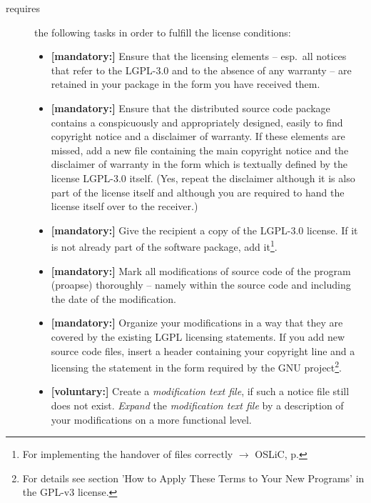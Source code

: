 \begin{description}
\item[requires] the following tasks in order to fulfill the license conditions:
\begin{itemize}
  
  \item \textbf{[mandatory:]} Ensure that the licensing elements -- esp.\ all
  notices that refer to the LGPL-3.0 and to the absence of any
  warranty -- are retained in your package in the form you have received them.

  \item \textbf{[mandatory:]} Ensure that the distributed source code package
  contains a conspicuously and appropriately designed, easily to find copyright
  notice and a disclaimer of warranty. If these elements are missed, add a new
  file containing the main copyright notice and the disclaimer of warranty in the
  form which is textually defined by the license LGPL-3.0 itself. (Yes, repeat
  the disclaimer although it is also part of the license itself and although you
  are required to hand the license itself over to the receiver.)
  
  \item \textbf{[mandatory:]} Give the recipient a copy of the LGPL-3.0 license.
  If it is not already part of the software package, add it\footnote{For
  implementing the handover of files correctly $\rightarrow$ OSLiC, p.
  \pageref{DistributingFilesHint}}.

  \item \textbf{[mandatory:]} Mark all modifications of source code of the
  program (proapse) thoroughly -- namely within the source code and including
  the date of the modification.
  
  \item \textbf{[mandatory:]} Organize your modifications in a way that they are
  covered by the existing LGPL licensing statements. If you add new source code
  files, insert a header containing your copyright line and a licensing the
  statement in the form required by the GNU project\footnote{For details see
  section 'How to Apply These Terms to Your New Programs' in the GPL-v3
  license.}.
  
  \item \textbf{[voluntary:]} Create a \emph{modification text file}, if such a
  notice file still does not exist. \emph{Expand} the \emph{modification text
  file} by a description of your modifications on a more functional level.
    

\end{itemize}
\end{description}
